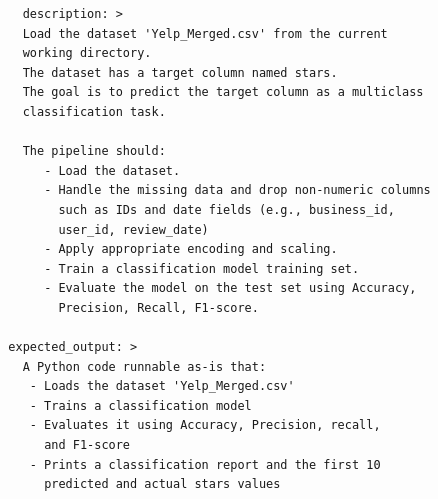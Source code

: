 \begin{tcolorbox}[ left=2pt,   right=2pt,   top=2pt,   bottom=2pt, colback=gray!5,colframe=black!40,title={Initial prompt (No Expertise)}]
\scriptsize
\setlength{\baselineskip}{0.6\baselineskip} \begin{verbatim}
    description: >
    Load the dataset 'Yelp_Merged.csv' from the current 
    working directory.
    The dataset has a target column named stars.
    The goal is to predict the target column as a multiclass 
    classification task.
    
    The pipeline should:
       - Load the dataset.
       - Handle the missing data and drop non-numeric columns 
         such as IDs and date fields (e.g., business_id, 
         user_id, review_date)
       - Apply appropriate encoding and scaling.
       - Train a classification model training set.
       - Evaluate the model on the test set using Accuracy, 
         Precision, Recall, F1-score.

  expected_output: >
    A Python code runnable as-is that:
     - Loads the dataset 'Yelp_Merged.csv'
     - Trains a classification model
     - Evaluates it using Accuracy, Precision, recall, 
       and F1-score
     - Prints a classification report and the first 10 
       predicted and actual stars values
\end{verbatim}
\end{tcolorbox}

